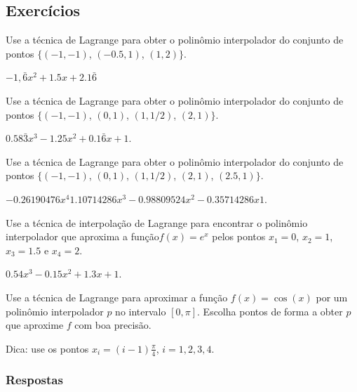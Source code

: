 \subsection{Exercícios}

\begin{exer}
  Use a técnica de Lagrange para obter o polinômio interpolador do conjunto de pontos $\{(-1, -1)$, $(-0.5, 1)$, $(1, 2)\}$.
\end{exer}
\begin{resp}
  $-1,\bar{6}x^2 + 1.5x + 2.1\bar{6}$
\end{resp}

\begin{exer}
  Use a técnica de Lagrange para obter o polinômio interpolador do conjunto de pontos $\{(-1, -1)$, $(0, 1)$, $(1, 1/2)$, $(2, 1)\}$.
\end{exer}
\begin{resp}
  $0.58\bar{3}x^3 - 1.25x^2 + 0.1\bar{6}x + 1$. 
\end{resp}

\begin{exer}
  Use a técnica de Lagrange para obter o polinômio interpolador do conjunto de pontos $\{(-1, -1)$, $(0, 1)$, $(1, 1/2)$, $(2, 1)$, $(2.5, 1)\}$.
\end{exer}
\begin{resp}
  $-0.26190476x^4  1.10714286x^3 -0.98809524x^2 -0.35714286x  1$.  
\end{resp}

\begin{exer}
  Use a técnica de interpolação de Lagrange para encontrar o polinômio interpolador que aproxima a função$f(x)=e^{x}$ pelos pontos $x_1=0$, $x_2=1$, $x_3=1.5$ e $x_4=2$.
\end{exer}
\begin{resp}
$0.54x^3 - 0.15x^2 + 1.3x + 1$.
\end{resp}

\begin{exer}
  Use a técnica de Lagrange para aproximar a função $f(x) = \cos(x)$ por um polinômio interpolador $p$ no intervalo $[0, \pi]$. Escolha pontos de forma a obter $p$ que aproxime $f$ com boa precisão.
\end{exer}
\begin{resp}
  Dica: use os pontos $x_i = (i-1)\frac{\pi}{4}$, $i = 1, 2, 3, 4$.
\end{resp}

\ifisbook
\subsubsection{Respostas}
\shipoutAnswer
\fi


